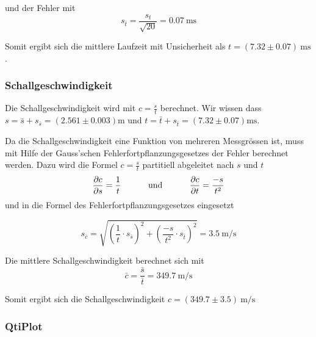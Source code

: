 und der Fehler mit
\begin{equation}
    s_{\bar{t}} = \frac{s_t}{\sqrt{20}} = \SI{0.07}{\milli\second}
\end{equation}

Somit ergibt sich die mittlere Laufzeit mit Unsicherheit als $t = (7.32 \pm 0.07)\SI{}{\milli\second}$.

\subsubsection*{Schallgeschwindigkeit}

Die Schallgeschwindigkeit wird mit $c=\frac{s}{t}$ berechnet. Wir wissen dass
$s=\bar{s}+s_{\bar{s}}=(2.561\pm0.003) \textrm{m}$
und
$t=\bar{t}+s_{\bar{t}}=(7.32\pm0.07) \textrm{ms}$.

Da die Schallgeschwindigkeit eine Funktion von mehreren Messgr\"ossen ist, muss mit Hilfe der
Gauss'schen Fehlerfortpflanzungsgesetzes der Fehler berechnet werden. Dazu wird die Formel $c=\frac{s}{t}$
partitiell abgeleitet nach $s$ und $t$
\begin{equation}
	\frac{\partial c}{\partial s} = \frac{1}{t} \textrm{\hspace{10mm} und \hspace{10mm}} \frac{\partial c}{\partial{t}} = \frac{-s}{t^2}
\end{equation}
und in die Formel des Fehlerfortpflanzungsgesetzes eingesetzt

\begin{equation}
	s_{\bar{c}} = \sqrt{\left(\frac{1}{t} \cdot s_{\bar{s}}\right)^2 + \left(\frac{-s}{t^2} \cdot s_{\bar{t}}\right)^2} = 3.5 \SI{}{\meter\per\second}
\end{equation}

Die mittlere Schallgeschwindigkeit berechnet sich mit
\begin{equation}
	\bar{c}=\frac{\bar{s}}{\bar{t}} = 349.7 \SI{}{\meter\per\second}
\end{equation}

Somit ergibt sich die Schallgeschwindigkeit
$c=(349.7 \pm 3.5) \SI{}{\meter\per\second}$


\subsubsection*{QtiPlot}

